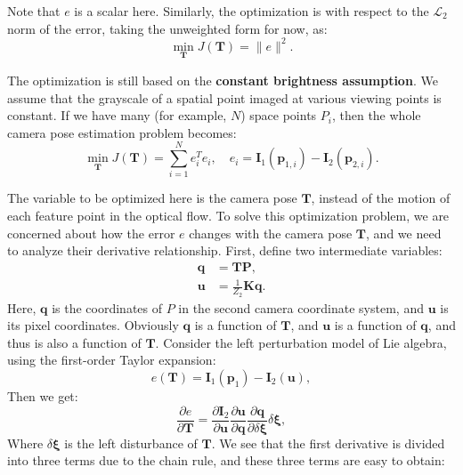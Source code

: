 Note that $e$ is a scalar here. Similarly, the optimization is with respect to the $\mathcal{L}_2$ norm of the error, taking the unweighted form for now, as:
\begin{equation}
\mathop {\min }\limits_{\mathbf{T}}  J\left( \mathbf{T}  \right) = \|e\|^2.
\end{equation}

The optimization is still based on the \textbf{constant brightness assumption}. We assume that the grayscale of a spatial point imaged at various viewing points is constant. If we have many (for example, $N$) space points $P_i$, then the whole camera pose estimation problem becomes:
\begin{equation}
\mathop {\min }\limits_{\mathbf{T}}  J\left( \mathbf{T}  \right) = \sum\limits_{i = 1}^N {e_i^T{e_i}}, \quad {e_i} = {\mathbf{I}_1}\left( {{\mathbf{p}_{1,i}}} \right) - {\mathbf{I}_2}\left( {{ \mathbf{p}_{2,i}}} \right).
\end{equation}

The variable to be optimized here is the camera pose $\mathbf{T}$, instead of the motion of each feature point in the optical flow. To solve this optimization problem, we are concerned about how the error $e$ changes with the camera pose $\mathbf{T}$, and we need to analyze their derivative relationship. First, define two intermediate variables:
\begin{align*}
\mathbf{q} &= \mathbf{T} \mathbf{P}, \\
\mathbf{u} &= \frac{1}{{{Z_2}}} \mathbf{K} \mathbf{q}.
\end{align*}
Here, $\mathbf{q}$ is the coordinates of $P$ in the second camera coordinate system, and $\mathbf{u}$ is its pixel coordinates. Obviously $\mathbf{q}$ is a function of $\mathbf{T}$, and $\mathbf{u}$ is a function of $\mathbf{q}$, and thus is also a function of $\mathbf{T}$. Consider the left perturbation model of Lie algebra, using the first-order Taylor expansion:
\begin{equation}
e(\mathbf{T})=\mathbf{I}_1(\mathbf{p}_{1})-\mathbf{I}_2(\mathbf{u}),
\end{equation}
Then we get:
\begin{equation}
\frac{\partial e}{\partial \mathbf{T}} = \frac{{\partial {\mathbf{I}_2}}}{{\partial \mathbf{u}}}\frac{{\partial \mathbf{u}}}{{\partial \mathbf{q}}}\frac{{\partial \mathbf{q}}}{{\partial \delta \boldsymbol{\xi} }}\delta \boldsymbol{\xi},
\end{equation}
Where $\delta \boldsymbol{\xi}$ is the left disturbance of $\mathbf{T}$. We see that the first derivative is divided into three terms due to the chain rule, and these three terms are easy to obtain:

